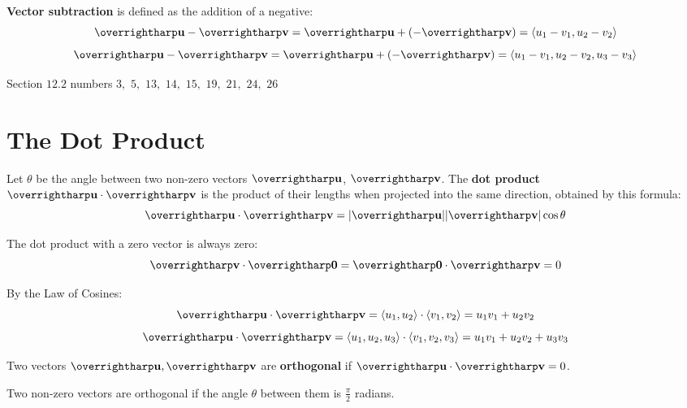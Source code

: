 \documentclass[letterpaper, twoside, 12pt]{book}
\begin{document}
\begin{definition}
  \textbf{Vector subtraction} is defined as the addition of a negative:
  \[
    \harpvec{u}-\harpvec{v}
      =
    \harpvec{u}+(-\harpvec{v})
      =
    \<u_1-v_1,u_2-v_2\>
  \]
  \[
    \harpvec{u}-\harpvec{v}
      =
    \harpvec{u}+(-\harpvec{v})
      =
    \<u_1-v_1,u_2-v_2,u_3-v_3\>
  \]
\end{definition}

\begin{suggestedHW}
Section $12.2$ numbers $3,$ $5,$ $13,$ $14,$ $15,$ $19,$ $21,$ $24,$ $26$
\end{suggestedHW}



\section{The Dot Product}

\begin{definition}
  Let $\theta$ be the angle between two non-zero vectors $\harpvec{u}$, $\harpvec{v}$.
  The \textbf{dot product} $\harpvec{u}\cdot\harpvec{v}$ is the product of their
  lengths when projected into the same direction, obtained by this formula:
  \[
    \harpvec{u} \cdot \harpvec{v} = |\harpvec{u}||\harpvec{v}|\cos \theta
  \]
\end{definition}

\begin{definition}
  The dot product with a zero vector is always zero:
  \[\harpvec{v}\cdot\harpvec{0}=\harpvec{0}\cdot\harpvec{v}=0\]
\end{definition}

\begin{theorem}
By the Law of Cosines:
  \[
    \harpvec{u} \cdot \harpvec{v}
      =
    \<u_1,u_2\>\cdot\<v_1,v_2\>
      =
    u_1v_1 + u_2v_2
  \]
  \[
    \harpvec{u} \cdot \harpvec{v}
      =
    \<u_1,u_2,u_3\>\cdot\<v_1,v_2,v_3\>
      =
    u_1v_1 + u_2v_2 + u_3v_3
  \]
\end{theorem}

\begin{definition}
  Two vectors $\harpvec{u},\harpvec{v}$ are \textbf{orthogonal} if
  $\harpvec{u} \cdot \harpvec{v} = 0$.
\end{definition}

\begin{theorem}
  Two non-zero vectors are orthogonal if the angle $\theta$ between them
  is $\frac{\pi}{2}$ radians.
\end{theorem}
\end{document}
